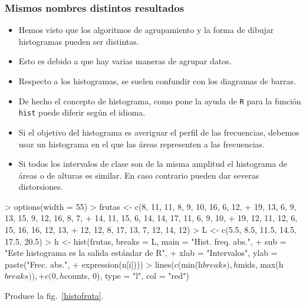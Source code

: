 \begin{frame}
\frametitle{Mismos nombres distintos resultados}
\begin{itemize}
\item Hemos visto que los algoritmos de agrupamiento y la forma de dibujar histogramas pueden ser distintas.
\item Esto es debido a que hay varias maneras de agrupar datos.
\item Respecto a los histogramas, se suelen confundir con los diagramas de barras.
\item De hecho el concepto de histograma, como pone la ayuda de \texttt{R} para la función \texttt{hist} puede diferir según el idioma.
\item Si el objetivo del histograma es averiguar el perfil de las frecuencias, debemos usar un histograma en el que las áreas representen a las frecuencias.
\item Si todos los intervalos de clase son de la misma amplitud  el histograma de áreas o de alturas es similar. En caso contrario pueden dar severas distorsiones. 
\end{itemize}
\end{frame}


\begin{frame}[fragile]

\begin{Schunk}
\begin{Sinput}
> options(width = 55)
> frutas <- c(8, 11, 11, 8, 9, 10, 16, 6, 12, 
+     19, 13, 6, 9, 13, 15, 9, 12, 16, 8, 7, 
+     14, 11, 15, 6, 14, 14, 17, 11, 6, 9, 10, 
+     19, 12, 11, 12, 6, 15, 16, 16, 12, 13, 
+     12, 12, 8, 17, 13, 7, 12, 14, 12)
> L <- c(5.5, 8.5, 11.5, 14.5, 17.5, 20.5)
> h <- hist(frutas, breaks = L, main = "Hist. freq. abs.", 
+     sub = "Este histograma es la salida estándar de R", 
+     xlab = "Intervalos", ylab = paste("Frec. abs.", 
+         expression(n[i])))
> lines(c(min(h$breaks), h$mids, max(h$breaks)), 
+     c(0, h$counts, 0), type = "l", col = "red")
\end{Sinput}
\end{Schunk}

Produce la fig.~\ref{histofruta}.
\end{frame}


